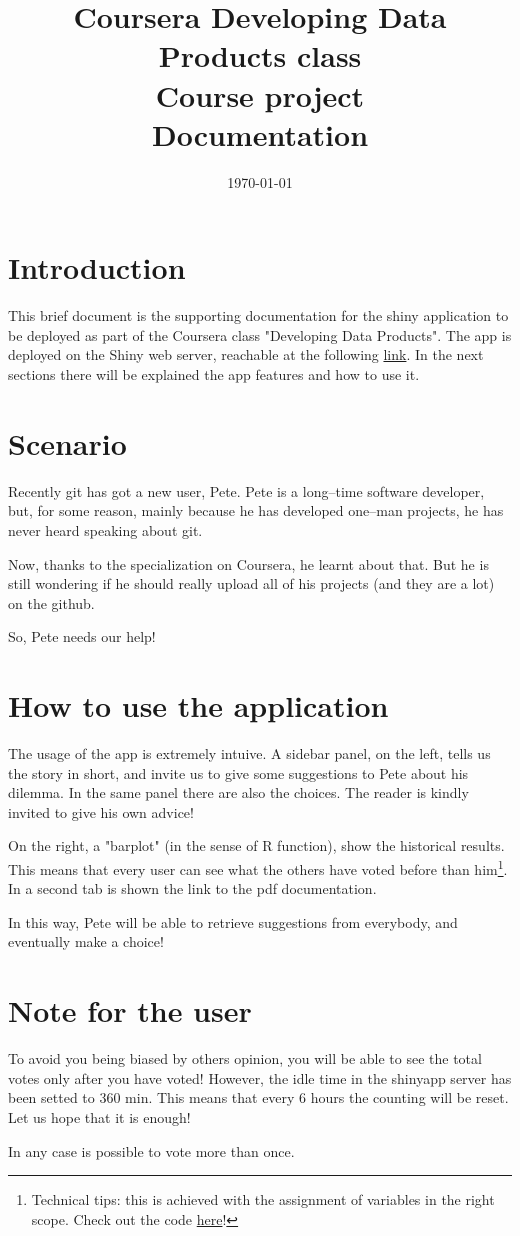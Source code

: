 \documentclass[a4paper,12pt]{article}
\title{Coursera Developing Data Products class\\ Course project\\Documentation}
\author{}
\date{\today}
\begin{document}
\maketitle

\section*{Introduction}
This brief document is the supporting documentation for the shiny application to be deployed as part of the Coursera class "Developing Data Products". The app is deployed on the Shiny web server, reachable at the following \href{https://pgrandinetti.shinyapps.io/shinyApp}{link}. In the next sections there will be explained the app features and how to use it.

\section*{Scenario}
Recently git has got a new user, Pete. Pete is a long--time software developer, but, for some reason, mainly because he has developed one--man projects, he has never heard speaking about git.

Now, thanks to the specialization on Coursera, he learnt about that. But he is still wondering if he should really upload all of his projects (and they are a lot) on the github.

So, Pete needs our help!

\section*{How to use the application}
The usage of the app is extremely intuive. A sidebar panel, on the left, tells us the story in short, and invite us to give some suggestions to Pete about his dilemma. In the same panel there are also the choices. The reader is kindly invited to give his own advice!

On the right, a "barplot" (in the sense of R function), show the historical results. This means that every user can see what the others have voted before than him\footnote{Technical tips: this is achieved with the assignment of variables in the right scope. Check out the code \href{https://github.com/pgrandinetti/dataproductclass}{here}!}. In a second tab is shown the link to the pdf documentation.

In this way, Pete will be able to retrieve suggestions from everybody, and eventually make a choice!

\section*{Note for the user}
To avoid you being biased by others opinion, you will be able to see the total votes only after you have voted! However, the idle time in the shinyapp server has been setted to 360 min. This means that every 6 hours the counting will be reset. Let us hope that it is enough!

In any case is possible to vote more than once.
\end{document}
